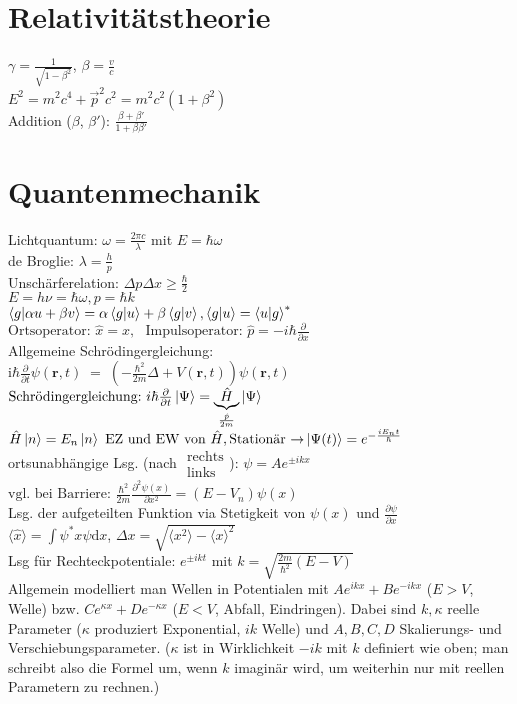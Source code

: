 \documentclass[a4paper, 11pt, fleqn]{article}
\renewcommand{\vec}{\overrightarrow}
\newcommand{\fpartial}[1]{\frac{\partial}{\partial #1}}
\newcommand{\ffpartial}[2]{\frac{\partial #1}{\partial #2}}
\begin{document}
\begin{multicols}{2}
\section{Relativitätstheorie}
$\gamma = \frac{1}{\sqrt{1 - \beta^2}}$, $\beta = \frac{v}{c}$\\
$E^2 = m^2 c^4 + \vec{p}^2 c^2 = m^2 c^2 (1 + \beta^2)$\\
Addition ($\beta$, $\beta'$): $\frac{\beta + \beta'}{1 + \beta \beta'}$

\section{Quantenmechanik}
Lichtquantum: $\omega = \frac{2 \pi c}{\lambda}$ mit $E = \hbar \omega$\\
de Broglie: $\lambda = \frac{h}{p}$\\
Unschärferelation: $\Delta p \Delta x \geq \frac{\hbar}{2}$\\
$E = h \nu = \hbar \omega, p = \hbar k$\\
$\braket{g | \alpha u + \beta v} = \alpha \braket{g | u} + \beta \braket{g | v}, \braket{g | u} = \braket{u | g}^\ast$\\
$\text{Ortsoperator:~} \hat{x} = x, \text{~~Impulsoperator:~} \hat{p} = -i \hbar \fpartial{x}$\\
Allgemeine Schrödingergleichung:\\
 $\mathrm i\hbar\frac{\partial}{\partial t}\psi(\mathbf{r},t) \;=\; \left(- \frac{\hbar^2}{2m}\Delta + V(\mathbf{r},t)\right)\psi(\mathbf{r},t)$\\
$\text{Schrödingergleichung:~} i\hbar \fpartial{t} \ket{\Psi} = \underbrace{\hat{H}}_{\frac{\hat{p}}{2m}} \ket{\Psi}$\\
$\hat{H} \ket{n} = E_n \ket{n} \text{~EZ und EW von $\hat{H}$}, \text{Stationär $\rightarrow$} \ket{\Psi(t)} = e^{-\frac{i E_n t}{\hbar}}$\\
ortsunabhängige Lsg. (nach $\substack{\text{rechts}\\\text{links}}$): $\psi = A e^{\pm i k x}$\\
$\text{vgl. bei Barriere:~} \frac{\hbar^2}{2m}\frac{\partial^2 \psi(x)}{\partial x^2} = (E - V_n) \psi(x)$\\
Lsg. der aufgeteilten Funktion via Stetigkeit von $\psi(x)$ und $\ffpartial{\psi}{x}$\\
$\langle \hat{x} \rangle = \int \psi^\ast x \psi \mathrm{d} x$, $\Delta x = \sqrt{\langle x^2 \rangle - \langle x \rangle^2}$\\
Lsg für Rechteckpotentiale: $e^{\pm ikt}$ mit $k= \sqrt{\frac{2m}{\hbar^2}(E-V)}$\\
Allgemein modelliert man Wellen in Potentialen mit $Ae^{ikx}+Be^{-ikx}$ ($E>V$, Welle) bzw. $Ce^{\kappa x}+De^{-\kappa x}$ ($E<V$, Abfall, Eindringen).
Dabei sind $k,\kappa$ reelle Parameter ($\kappa$ produziert Exponential, $ik$ Welle) und $A,B,C,D$ Skalierungs- und Verschiebungsparameter.
($\kappa$ ist in Wirklichkeit $-ik$ mit $k$ definiert wie oben; man schreibt also die Formel um, wenn $k$ imaginär wird, um weiterhin nur mit reellen Parametern zu rechnen.)


\end{multicols}
\end{document}

